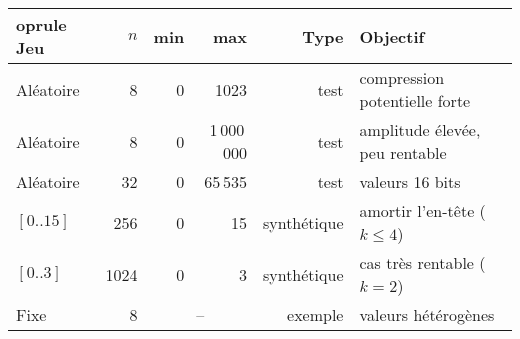 \begin{tabularx}{\textwidth}{lrrrrX}
	oprule
Jeu & $n$ & min & max & Type & Objectif \\
\midrule
Aléatoire & 8 & 0 & 1023 & test & compression potentielle forte \\
Aléatoire & 8 & 0 & 1\,000\,000 & test & amplitude élevée, peu rentable \\
Aléatoire & 32 & 0 & 65\,535 & test & valeurs 16 bits \\
$[0..15]$ & 256 & 0 & 15 & synthétique & amortir l'en-tête ($k\le 4$) \\
$[0..3]$ & 1024 & 0 & 3 & synthétique & cas très rentable ($k=2$) \\
Fixe & 8 & \multicolumn{2}{c}{--} & exemple & valeurs hétérogènes \\
\bottomrule
\end{tabularx}
